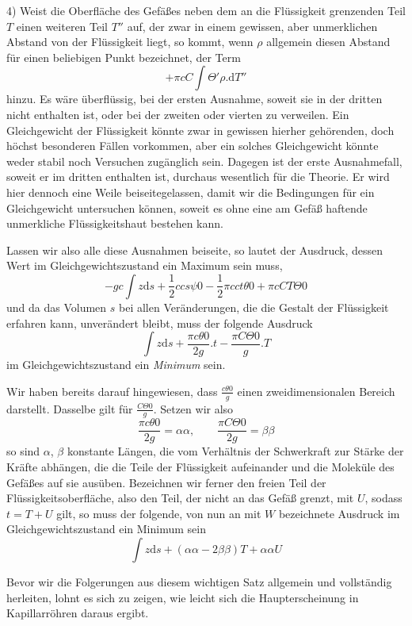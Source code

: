 4) Weist die Oberfläche des Gefäßes neben dem an die Flüssigkeit grenzenden Teil $T$ einen weiteren Teil $T''$ auf, der zwar in einem gewissen, aber unmerklichen Abstand von der Flüssigkeit liegt, so kommt, wenn $\rho$ allgemein diesen Abstand für einen beliebigen Punkt bezeichnet, der Term
\[
+\pi cC\int\Theta'\rho.\mathrm{d}T''
\]
hinzu. Es wäre überflüssig, bei der ersten Ausnahme, soweit sie in der dritten nicht enthalten ist, oder bei der zweiten oder vierten zu verweilen. Ein Gleichgewicht der Flüssigkeit könnte zwar in gewissen hierher gehörenden, doch höchst besonderen Fällen vorkommen, aber ein solches Gleichgewicht könnte weder stabil noch Versuchen zugänglich sein. Dagegen ist der erste Ausnahmefall, soweit er im dritten enthalten ist, durchaus wesentlich für die Theorie. Er wird hier dennoch eine Weile beiseitegelassen, damit wir die Bedingungen für ein Gleichgewicht untersuchen können, soweit es ohne eine am Gefäß haftende unmerkliche Flüssigkeitshaut bestehen kann.

Lassen wir also alle diese Ausnahmen beiseite, so lautet der Ausdruck, dessen Wert im Gleichgewichtszustand ein Maximum sein muss,
\[
-gc\int z\mathrm{d}s+\frac12ccs\psi0-\frac12\pi cct\theta0+\pi cCT\Theta0
\]
und da das Volumen $s$ bei allen Veränderungen, die die Gestalt der Flüssigkeit erfahren kann, unverändert bleibt, muss der folgende Ausdruck
\[
\int z\mathrm{d}s+\frac{\pi c\theta0}{2g}.t-\frac{\pi C\Theta0}{g}.T
\]
im Gleichgewichtszustand ein \textit{Minimum} sein.

Wir haben bereits darauf hingewiesen, dass $\frac{c\theta0}{g}$ einen zweidimensionalen Bereich darstellt. Dasselbe gilt für $\frac{C\Theta0}{g}$. Setzen wir also
\[
\frac{\pi c\theta0}{2g}=\alpha\alpha,\qquad\frac{\pi C\Theta0}{2g}=\beta\beta
\]
so sind $\alpha$, $\beta$ konstante Längen, die vom Verhältnis der Schwerkraft zur Stärke der Kräfte abhängen, die die Teile der Flüssigkeit aufeinander und die Moleküle des Gefäßes auf sie ausüben. Bezeichnen wir ferner den freien Teil der Flüssigkeitsoberfläche, also den Teil, der nicht an das Gefäß grenzt, mit $U$, sodass $t=T+U$ gilt, so muss der folgende, von nun an mit $W$ bezeichnete Ausdruck im Gleichgewichtszustand ein Minimum sein
\[
\int z\mathrm{d}s+(\alpha\alpha-2\beta\beta)T+\alpha\alpha U
\]

Bevor wir die Folgerungen aus diesem wichtigen Satz allgemein und vollständig herleiten, lohnt es sich zu zeigen, wie leicht sich die Haupterscheinung in Kapillarröhren daraus ergibt.

